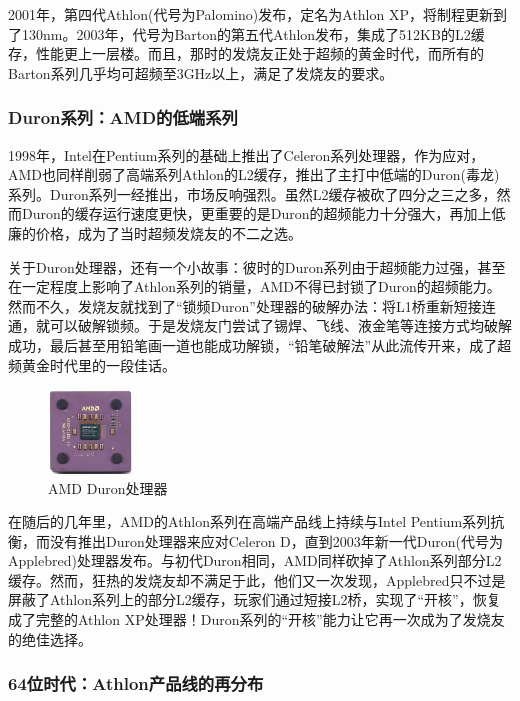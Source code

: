 \documentclass[UTF8]{ctexart}
\begin{document}
2001年，第四代Athlon(代号为Palomino)发布，定名为Athlon XP，将制程更新到了130nm。2003年，代号为Barton的第五代Athlon发布，集成了512KB的L2缓存，性能更上一层楼。而且，那时的发烧友正处于超频的黄金时代，而所有的Barton系列几乎均可超频至3GHz以上，满足了发烧友的要求。

\subsubsection{Duron系列：AMD的低端系列}

1998年，Intel在Pentium系列的基础上推出了Celeron系列处理器，作为应对，AMD也同样削弱了高端系列Athlon的L2缓存，推出了主打中低端的Duron(毒龙)系列。Duron系列一经推出，市场反响强烈。虽然L2缓存被砍了四分之三之多，然而Duron的缓存运行速度更快，更重要的是Duron的超频能力十分强大，再加上低廉的价格，成为了当时超频发烧友的不二之选。

关于Duron处理器，还有一个小故事：彼时的Duron系列由于超频能力过强，甚至在一定程度上影响了Athlon系列的销量，AMD不得已封锁了Duron的超频能力。然而不久，发烧友就找到了“锁频Duron”处理器的破解办法：将L1桥重新短接连通，就可以破解锁频。于是发烧友门尝试了锡焊、飞线、液金笔等连接方式均破解成功，最后甚至用铅笔画一道也能成功解锁，“铅笔破解法”从此流传开来，成了超频黄金时代里的一段佳话。
\begin{figure}[H]
    \begin{center}
        \includegraphics[width=0.2\textwidth]{figure/duron.jpg}
        \caption{AMD Duron处理器}
    \end{center}
\end{figure}

在随后的几年里，AMD的Athlon系列在高端产品线上持续与Intel Pentium系列抗衡，而没有推出Duron处理器来应对Celeron D，直到2003年新一代Duron(代号为Applebred)处理器发布。与初代Duron相同，AMD同样砍掉了Athlon系列部分L2缓存。然而，狂热的发烧友却不满足于此，他们又一次发现，Applebred只不过是屏蔽了Athlon系列上的部分L2缓存，玩家们通过短接L2桥，实现了“开核”，恢复成了完整的Athlon XP处理器！Duron系列的“开核”能力让它再一次成为了发烧友的绝佳选择。

\subsubsection{64位时代：Athlon产品线的再分布}
\end{document}
